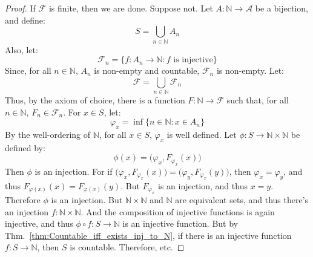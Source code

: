 \documentclass[crop=false,class=book,oneside]{standalone}
\begin{document}
            \begin{proof}
                If $\mathcal{F}$ is finite, then we are done. Suppose not.
                Let $A:\mathbb{N}\rightarrow\mathcal{A}$ be a bijection,
                and define:
                \begin{equation}
                    S=\bigcup_{n\in\mathbb{N}}A_{n}
                \end{equation}
                Also, let:
                \begin{equation}
                    \mathcal{F}_{n}
                    =\{f:A_{n}\rightarrow\mathbb{N}:
                        f\textrm{ is injective}\}
                \end{equation}
                Since, for all $n\in\mathbb{N}$, $A_{n}$ is
                non-empty and countable, $\mathcal{F}_{n}$
                is non-empty. Let:
                \begin{equation}
                    \mathcal{F}
                    =\bigcup_{n\in\mathbb{N}}\mathcal{F}_{n}
                \end{equation}
                Thus, by the axiom of choice, there is a function
                $F:\mathbb{N}\rightarrow\mathcal{F}$ such that, for all
                $n\in\mathbb{N}$, $F_{n}\in\mathcal{F}_{n}$. For
                $x\in{S}$, let:
                \begin{equation}
                    \varphi_{x}
                    =\inf\{n\in\mathbb{N}:x\in{A}_{n}\}
                \end{equation}
                By the well-ordering of $\mathbb{N}$, for all
                $x\in{S}$, $\varphi_{x}$ is well defined. Let
                $\phi:S\rightarrow\mathbb{N}\times\mathbb{N}$
                be defined by:
                \begin{equation}
                    \phi(x)
                    =\big(\varphi_{x},F_{\varphi_{x}}(x)\big)
                \end{equation}
                Then $\phi$ is an injection. For if
                $\big(\varphi_{x},F_{\varphi_{x}}(x)\big)=%
                 \big(\varphi_{y},F_{\varphi_{x}}(y)\big)$, then
                $\varphi_{x}=\varphi_{y}$, and thus
                $F_{\varphi(x)}(x)=F_{\varphi(x)}(y)$. But
                $F_{\varphi_{x}}$ is an injection, and
                thus $x=y$. Therefore $\phi$ is an injection.
                But $\mathbb{N}\times\mathbb{N}$ and $\mathbb{N}$
                are equivalent sets, and thus there's an
                injection $f:\mathbb{N}\times\mathbb{N}$. And
                the composition of injective functions is again
                injective, and thus
                $\phi\circ{f}:S\rightarrow\mathbb{N}$ is an
                injective function. But by
                Thm.~\ref{thm:Countable_iff_exists_inj_to_N},
                if there is an injective function
                $f:S\rightarrow\mathbb{N}$, then $S$ is
                countable. Therefore, etc.
            \end{proof}
\end{document}
